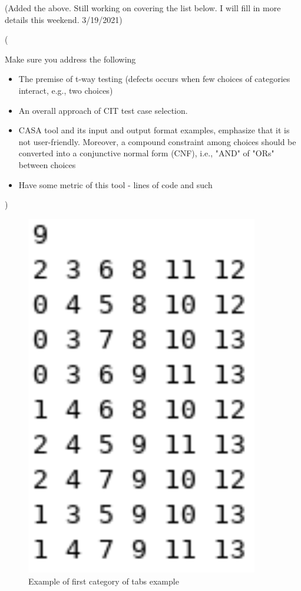 \documentclass[a4full,12pt]{article}
\newcommand{\eas}[1]{{\color{blue}\sf ({#1})}}
\newcommand{\ag}[1]{{\color{red}\sf ({#1})}}
\begin{document}
\ag{Added the above. Still working on covering the list below. I will fill in more details this weekend. 3/19/2021} 
\eas{Make sure you address the following
\begin{itemize}
\item The premise of t-way testing (defects occurs when few choices of categories interact, e.g., two choices)
\item An overall approach of CIT test case selection.
\item CASA tool and its input and output format examples, emphasize that it is not user-friendly. Moreover, a compound constraint among choices should be converted into a conjunctive normal form (CNF), i.e., "AND" of "ORs" between choices
\item Have some metric of this tool - lines of code and such
\end{itemize}
}


\begin{figure}[htb]
\centering
\includegraphics[width=4in,keepaspectratio]{images/casa_output.png}
\caption{Example of first category of tabs example}
\label{fig:casa_output}
\end{figure}
\end{document}
